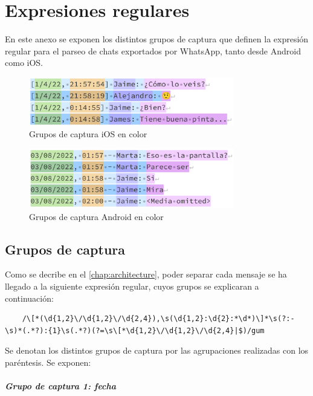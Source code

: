 \chapter{Expresiones regulares} \label{chap:regex}

En este anexo se exponen los distintos grupos de captura que definen la expresión regular para el parseo de chats exportados por WhatsApp, tanto desde Android como iOS.

\begin{figure}[h]
	\centering
	\includegraphics[width=0.8\textwidth]{img/regex_ios.png}
	\caption{Grupos de captura iOS en color}
	\label{fig:chap:regex_ios}
\end{figure}

\begin{figure}[h]
	\centering
	\includegraphics[width=0.8\textwidth]{img/regex_android.png}
	\caption{Grupos de captura Android en color}
	\label{fig:chap:regex_android}
\end{figure}

\section{Grupos de captura}

Como se decribe en el \autoref{chap:architecture}, poder separar cada mensaje se ha llegado a la siguiente expresión regular, cuyos grupos se explicaran a continuación:

\begin{lstlisting}
	/\[*(\d{1,2}\/\d{1,2}\/\d{2,4}),\s(\d{1,2}:\d{2}:*\d*)\]*\s(?:-\s)*(.*?):{1}\s(.*?)(?=\s\[*\d{1,2}\/\d{1,2}\/\d{2,4}|$)/gum
\end{lstlisting}

Se denotan los distintos grupos de captura por las agrupaciones realizadas con los paréntesis. Se exponen:

\paragraph{Grupo de captura 1: fecha}\mbox{}\\

